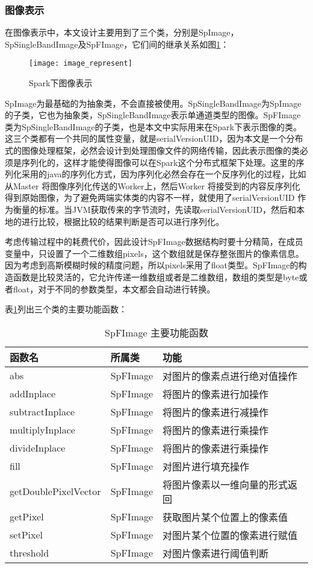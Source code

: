 \subsubsection{图像表示}
在图像表示中，本文设计主要用到了三个类，分别是SpImage，SpSingleBandImage及SpFImage，它们间的继承关系如图\ref{fig:image_represent}：
\begin{figure}[htp]
\centering
\texttt{[image: image\_represent]}
\caption{Spark下图像表示}
\label{fig:image_represent}
\end{figure}
SpImage为最基础的为抽象类，不会直接被使用。SpSingleBandImage为SpImage的子类，它也为抽象类，SpSingleBandImage表示单通道类型的图像。SpFImage类为SpSingleBandImage的子类，也是本文中实际用来在Spark下表示图像的类。这三个类都有一个共同的属性变量，就是serialVersionUID，因为本文是一个分布式的图像处理框架，必然会设计到处理图像文件的网络传输，因此表示图像的类必须是序列化的，这样才能使得图像可以在Spark这个分布式框架下处理。这里的序列化采用的java的序列化方式，因为序列化必然会存在一个反序列化的过程，比如从Master 将图像序列化传送的Worker上，然后Worker 将接受到的内容反序列化得到原始图像，为了避免两端实体类的内容不一样，就使用了serialVersionUID 作为衡量的标准。当JVM获取传来的字节流时，先读取serialVersionUID，然后和本地的进行比较，根据比较的结果判断是否可以进行序列化。

考虑传输过程中的耗费代价，因此设计SpFImage数据结构时要十分精简，在成员变量中，只设置了一个二维数组pixels，这个数组就是保存整张图片的像素信息。因为考虑到高斯模糊时候的精度问题，所以pixels采用了float类型。SpFImage的构造函数是比较灵活的，它允许传递一维数组或者是二维数组，数组的类型是byte或者float，对于不同的参数类型，本文都会自动进行转换。

表\ref{tab:SpFImage_function}列出三个类的主要功能函数：
\begin{table}[h] %
\caption{SpFImage 主要功能函数} %
\centering
\label{tab:SpFImage_function}
\begin{tabular}{p{4cm}|p{2cm}|p{6cm}} %
\hline
\hline
函数名  & 所属类 & 功能 \\ %
\hline %
abs  & SpFImage & 对图片的像素点进行绝对值操作\\
\hline
addInplace  & SpFImage & 将图片的像素进行加操作\\
\hline
subtractInplace  & SpFImage & 将图片的像素进行减操作\\
\hline
multiplyInplace  & SpFImage & 将图片的像素进行乘操作\\
\hline
divideInplace  & SpFImage & 将图片的像素进行乘操作\\
\hline
fill  & SpFImage & 对图片进行填充操作\\
\hline
getDoublePixelVector & SpFImage & 将图片像素以一维向量的形式返回\\
\hline
getPixel& SpFImage & 获取图片某个位置上的像素值\\
\hline
setPixel & SpFImage & 对图片某个位置的像素进行赋值\\
\hline
threshold & SpFImage & 对图片像素进行阈值判断\\
\hline
\hline
\end{tabular}
\end{table}
